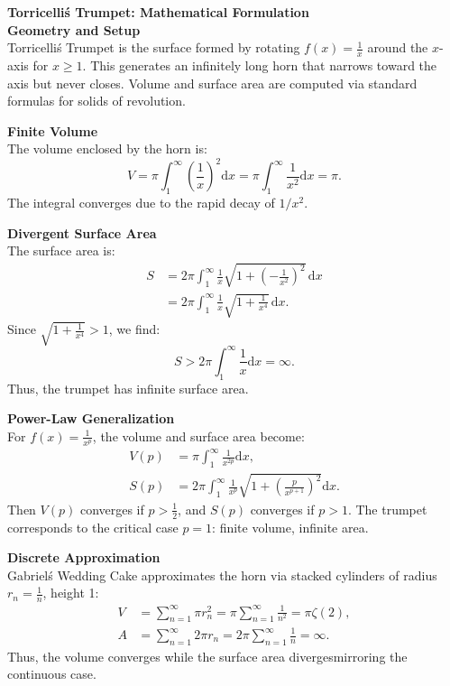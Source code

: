 \begin{technical}
{\Large\textbf{Torricelli\'s Trumpet: Mathematical Formulation}}\\[0.7em]

\textbf{Geometry and Setup}\\[0.5em]
Torricelli\'s Trumpet is the surface formed by rotating \( f(x) = \frac{1}{x} \) around the \(x\)-axis for \(x \ge 1\). This generates an infinitely long horn that narrows toward the axis but never closes. Volume and surface area are computed via standard formulas for solids of revolution.

\vspace{0.5em}
\textbf{Finite Volume}\\[0.5em]
The volume enclosed by the horn is:
\[
V = \pi \int_{1}^{\infty} \left(\frac{1}{x}\right)^2 \mathrm{d}x
= \pi \int_{1}^{\infty} \frac{1}{x^2} \mathrm{d}x = \pi.
\]
The integral converges due to the rapid decay of \(1/x^2\).

\vspace{0.5em}
\textbf{Divergent Surface Area}\\[0.5em]
The surface area is:
\begin{align*}
S &= 2\pi \int_{1}^{\infty} \frac{1}{x} \sqrt{1 + \left(-\frac{1}{x^2}\right)^2}\,\mathrm{d}x 
\\&= 2\pi \int_{1}^{\infty} \frac{1}{x} \sqrt{1 + \frac{1}{x^4}}\,\mathrm{d}x.
\end{align*}
Since \(\sqrt{1 + \frac{1}{x^4}} > 1\), we find:
\[
S > 2\pi \int_{1}^{\infty} \frac{1}{x} \mathrm{d}x = \infty.
\]
Thus, the trumpet has infinite surface area.

\vspace{0.5em}
\textbf{Power-Law Generalization}\\[0.5em]
For \(f(x) = \frac{1}{x^p}\), the volume and surface area become:
\begin{align*}
V(p) &= \pi \int_1^\infty \frac{1}{x^{2p}} \mathrm{d}x,\\
S(p) &= 2\pi \int_1^\infty \frac{1}{x^p} 
\sqrt{1 + \left(\frac{p}{x^{p+1}}\right)^2} \mathrm{d}x.
\end{align*}
Then \(V(p)\) converges if \(p > \tfrac{1}{2}\), and \(S(p)\) converges if \(p > 1\). The trumpet corresponds to the critical case \(p = 1\): finite volume, infinite area.

\vspace{0.5em}
\textbf{Discrete Approximation}\\[0.5em]
Gabriel\'s Wedding Cake approximates the horn via stacked cylinders of radius \(r_n = \frac{1}{n}\), height 1:
\begin{align*}
V &= \sum_{n=1}^{\infty} \pi r_n^2 
= \pi \sum_{n=1}^{\infty} \frac{1}{n^2} = \pi \zeta(2),\\
A &= \sum_{n=1}^{\infty} 2\pi r_n 
= 2\pi \sum_{n=1}^{\infty} \frac{1}{n} = \infty.
\end{align*}
Thus, the volume converges while the surface area diverges\textemdash mirroring the continuous case.


\end{technical}
